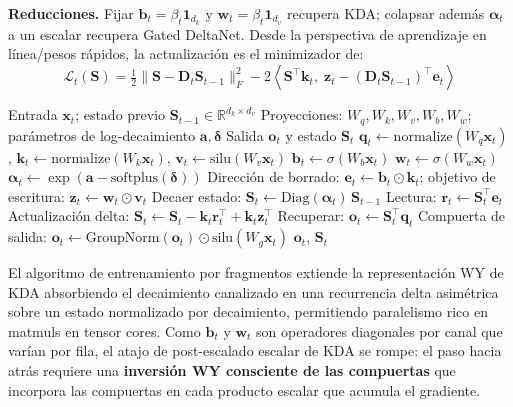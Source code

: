 \documentclass[11pt,a4paper]{article}
\begin{document}
\textbf{Reducciones.} Fijar $\mathbf{b}_t = \beta_t \mathbf{1}_{d_k}$ y $\mathbf{w}_t = \beta_t \mathbf{1}_{d_v}$ recupera KDA; colapsar además $\boldsymbol{\alpha}_t$ a un escalar recupera Gated DeltaNet. Desde la perspectiva de aprendizaje en línea/pesos rápidos, la actualización es el minimizador de:
\[
\mathcal{L}_t(\mathbf{S}) = \tfrac{1}{2}\|\mathbf{S} - \mathbf{D}_t \mathbf{S}_{t-1}\|_F^2 - 2\left\langle \mathbf{S}^\top \mathbf{k}_t,\; \mathbf{z}_t - (\mathbf{D}_t \mathbf{S}_{t-1})^\top \mathbf{e}_t \right\rangle
\]

\begin{algorithm}[H]
\caption{Avance Recurrente de Gated DeltaNet-2 (Forma de Referencia)}
\begin{algorithmic}[1]
\Require Entrada $\mathbf{x}_t$; estado previo $\mathbf{S}_{t-1} \in \mathbb{R}^{d_k \times d_v}$
\Require Proyecciones: $W_q, W_k, W_v, W_b, W_w$; parámetros de log-decaimiento $\mathbf{a}, \boldsymbol{\delta}$
\Ensure Salida $\mathbf{o}_t$ y estado $\mathbf{S}_t$
\State $\mathbf{q}_t \gets \mathrm{normalize}(W_q \mathbf{x}_t)$, $\mathbf{k}_t \gets \mathrm{normalize}(W_k \mathbf{x}_t)$, $\mathbf{v}_t \gets \mathrm{silu}(W_v \mathbf{x}_t)$
\State $\mathbf{b}_t \gets \sigma(W_b \mathbf{x}_t)$ 
\State $\mathbf{w}_t \gets \sigma(W_w \mathbf{x}_t)$ 
\State $\boldsymbol{\alpha}_t \gets \exp(\mathbf{a} - \mathrm{softplus}(\boldsymbol{\delta}))$ 
\State Dirección de borrado: $\mathbf{e}_t \gets \mathbf{b}_t \odot \mathbf{k}_t$; objetivo de escritura: $\mathbf{z}_t \gets \mathbf{w}_t \odot \mathbf{v}_t$
\State Decaer estado: $\mathbf{S}_t \gets \mathrm{Diag}(\boldsymbol{\alpha}_t)\, \mathbf{S}_{t-1}$
\State Lectura: $\mathbf{r}_t \gets \mathbf{S}_t^\top \mathbf{e}_t$ 
\State Actualización delta: $\mathbf{S}_t \gets \mathbf{S}_t - \mathbf{k}_t \mathbf{r}_t^\top + \mathbf{k}_t \mathbf{z}_t^\top$
\State Recuperar: $\mathbf{o}_t \gets \mathbf{S}_t^\top \mathbf{q}_t$
\State Compuerta de salida: $\mathbf{o}_t \gets \mathrm{GroupNorm}(\mathbf{o}_t) \odot \mathrm{silu}(W_g \mathbf{x}_t)$
\State \Return $\mathbf{o}_t$, $\mathbf{S}_t$
\end{algorithmic}
\end{algorithm}

El algoritmo de entrenamiento por fragmentos extiende la representación WY de KDA absorbiendo el decaimiento canalizado en una recurrencia delta asimétrica sobre un estado normalizado por decaimiento, permitiendo paralelismo rico en matmuls en tensor cores. Como $\mathbf{b}_t$ y $\mathbf{w}_t$ son operadores diagonales por canal que varían por fila, el atajo de post-escalado escalar de KDA se rompe: el paso hacia atrás requiere una \textbf{inversión WY consciente de las compuertas} que incorpora las compuertas en cada producto escalar que acumula el gradiente.
\end{document}
